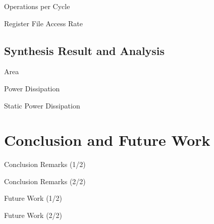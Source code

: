 \documentclass{beamer}
\begin{document}
\begin{CJK}{UTF8}{bkai}
\begin{frame}{Operations per Cycle}
    \end{frame}

    \begin{frame}{Register File Access Rate}
        
    \end{frame}

    \subsection{Synthesis Result and Analysis}

    \begin{frame}{Area}
        
    \end{frame}

    \begin{frame}{Power Dissipation}
        
    \end{frame}

    \begin{frame}{Static Power Dissipation}
        
    \end{frame}

    \section{Conclusion and Future Work}
    \begin{frame}{Conclusion Remarks (1/2)}
        
    \end{frame}
    \begin{frame}{Conclusion Remarks (2/2)}
        
    \end{frame}
    \begin{frame}{Future Work (1/2)}
        
    \end{frame}

    \begin{frame}{Future Work (2/2)}
        
    \end{frame}
\end{CJK}
\end{document}
